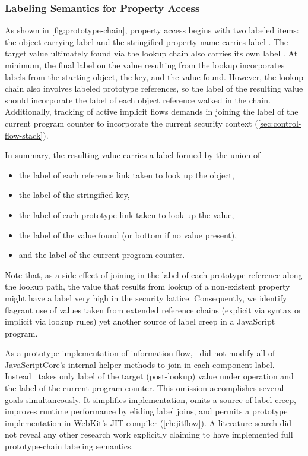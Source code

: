 \subsubsection{Labeling Semantics for Property Access}
As shown in \autoref{fig:prototype-chain}, property access begins with two labeled items: the object  carrying label  and the stringified property name  carries label .
The target value  ultimately found via the lookup chain also carries its own label .
At minimum, the final label on the value resulting from the lookup incorporates labels from the starting object, the key, and the value found.
However, the lookup chain also involves labeled prototype references, so the label of the resulting value should incorporate the label of each object reference walked in the chain.
Additionally, tracking of active implicit flows demands in joining the label of the current program counter to incorporate the current security context (\autoref{sec:control-flow-stack}).

In summary, the resulting value carries a label formed by the union of
\begin{itemize}
  \item the label of each reference link taken to look up the object,
  \item the label of the stringified key,
  \item the label of each prototype link taken to look up the value,
  \item the label of the value found (or bottom if no value present),
  \item and the label of the current program counter.
\end{itemize}

Note that, as a side-effect of joining in the label of each prototype reference along the lookup path, the  value that results from lookup of a non-existent property might have a label very high in the security lattice.
Consequently, we identify flagrant use of values taken from extended reference chains (explicit via syntax or implicit via lookup rules) yet another source of label creep in a JavaScript program.

As a prototype implementation of information flow, \FlowCore\ did not modify all of JavaScriptCore's internal helper methods to join in each component label.
Instead \FlowCore\ takes only label of the target (post-lookup) value under operation and the label of the current program counter.
This omission accomplishes several goals simultaneously.
It simplifies implementation, omits a source of label creep, improves runtime performance by eliding label joins, and permits a prototype implementation in WebKit's JIT compiler (\autoref{ch:jitflow}).
A literature search did not reveal any other research work explicitly claiming to have implemented full prototype-chain labeling semantics. %

